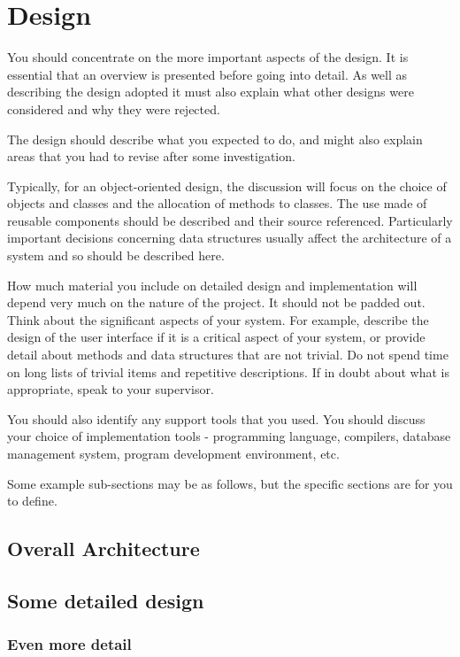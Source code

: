 \chapter{Design}

You should concentrate on the more important aspects of the design. It is essential that an overview is presented before going into detail. As well as describing the design adopted it must also explain what other designs were considered and why they were rejected.

The design should describe what you expected to do, and might also explain areas that you had to revise after some investigation.

Typically, for an object-oriented design, the discussion will focus on the choice of objects and classes and the allocation of methods to classes. The use made of reusable components should be described and their source referenced. Particularly important decisions concerning data structures usually affect the architecture of a system and so should be described here.

How much material you include on detailed design and implementation will depend very much on the nature of the project. It should not be padded out. Think about the significant aspects of your system. For example, describe the design of the user interface if it is a critical aspect of your system, or provide detail about methods and data structures that are not trivial. Do not spend time on long lists of trivial items and repetitive descriptions. If in doubt about what is appropriate, speak to your supervisor.
 
You should also identify any support tools that you used. You should discuss your choice of implementation tools - programming language, compilers, database management system, program development environment, etc.

Some example sub-sections may be as follows, but the specific sections are for you to define. 

\section{Overall Architecture}

\section{Some detailed design}

\subsection{Even more detail}

